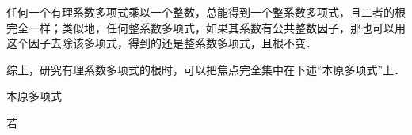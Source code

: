 
任何一个有理系数多项式乘以一个整数，总能得到一个整系数多项式，且二者的根完全一样；类似地，任何整系数多项式，如果其系数有公共整数因子，那也可以用这个因子去除该多项式，得到的还是整系数多项式，且根不变．

综上，研究有理系数多项式的根时，可以把焦点完全集中在下述“本原多项式”上．


\begin{definition}{本原多项式}

若

\end{definition}




















